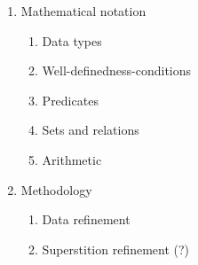 \begin{enumerate}
\begin{enumerate}
\begin{enumerate}
    \end{enumerate}
  \end{enumerate}
\item Mathematical notation
  \begin{enumerate}
  \item Data types
  \item Well-definedness-conditions
  \item Predicates
  \item Sets and relations
  \item Arithmetic
  \end{enumerate}
\item Methodology
  \begin{enumerate}
  \item Data refinement
  \item Superstition refinement (?)
  \end{enumerate}

\end{enumerate}

